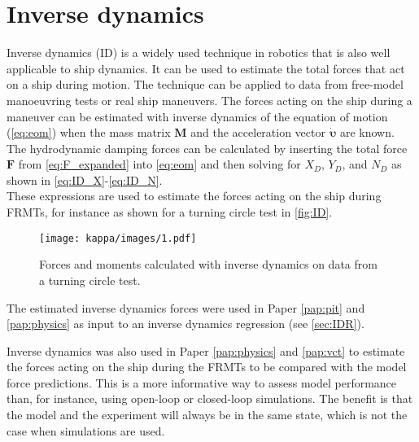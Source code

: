 \section{Inverse dynamics} \label{sec:ID}
Inverse dynamics (ID) is a widely used technique in robotics \cite{faber_inverse_2018, haninger_nonparametric_2019, mastalli_inverse-dynamics_2023, sun_high-order_2023, kurtz_inverse_2023} that is also well applicable to ship dynamics. It can be used to estimate the total forces that act on a ship during motion. The technique can be applied to data from free-model manoeuvring tests or real ship maneuvers. The forces acting on the ship during a maneuver can be estimated with inverse dynamics of the equation of motion (\autoref{eq:eom}) when the mass matrix $\mathbf{M}$ and the acceleration vector $\pmb{\bm{\dot{\upsilon}}}$ are known. The hydrodynamic damping forces can be calculated by inserting the total force $\mathbf{F}$ from \autoref{eq:F_expanded} into \autoref{eq:eom} and then solving for $X_D$, $Y_D$, and $N_D$ as shown in \autoref{eq:ID_X}-\autoref{eq:ID_N}.
\begin{equation}
    \label{eq:ID_X}
    
\end{equation}
\begin{equation}
    \label{eq:ID_Y}
    
\end{equation}
\begin{equation}
    \label{eq:ID_N}
    
\end{equation}
These expressions are used to estimate the forces acting on the ship during FRMTs, for instance as shown for a turning circle test in \autoref{fig:ID}.
\begin{figure}[H]
    \centering
    \texttt{[image: kappa/images/1.pdf]}
    \caption{Forces and moments calculated with inverse dynamics on data from a turning circle test.}
    \label{fig:ID}
\end{figure}

The estimated inverse dynamics forces were used in Paper \ref{pap:pit} and \ref{pap:physics} as input to an inverse dynamics regression (see \autoref{sec:IDR}). 

Inverse dynamics was also used in Paper \ref{pap:physics} and \ref{pap:vct} to estimate the forces acting on the ship during the FRMTs to be compared with the model force predictions. This is a more informative way to assess model performance than, for instance, using open-loop or closed-loop simulations. The benefit is that the model and the experiment will always be in the same state, which is not the case when simulations are used.